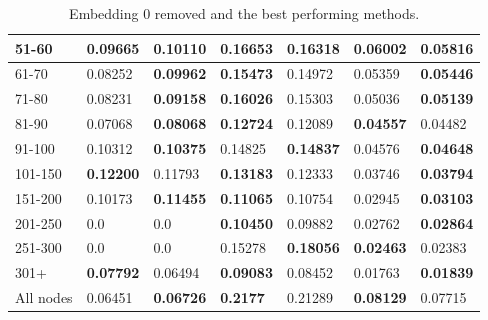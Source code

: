 \begin{table}[h!]
\begin{tabular}{|l|l|l||l|l||l|l|}
        51-60     & 0.09665                                 & \textbf{0.10110}               & \textbf{0.16653}                 & 0.16318           & 0.06002          & \textbf{0.05816}  \\ \hline
        61-70     & 0.08252                                 & \textbf{0.09962}               & \textbf{0.15473}                 & 0.14972           & 0.05359          & \textbf{0.05446}  \\ \hline
        71-80     & 0.08231                                 & \textbf{0.09158}               & \textbf{0.16026}                 & 0.15303           & 0.05036          & \textbf{0.05139}  \\ \hline
        81-90     & 0.07068                                 & \textbf{0.08068}               & \textbf{0.12724}                 & 0.12089           & \textbf{0.04557} & 0.04482           \\ \hline
        91-100    & 0.10312                                 & \textbf{0.10375}               & 0.14825                          & \textbf{0.14837}  & 0.04576          & \textbf{0.04648}  \\ \hline
        101-150   & \textbf{0.12200}                        & 0.11793                        & \textbf{0.13183}                 & 0.12333           & 0.03746          & \textbf{0.03794}  \\ \hline
        151-200   & 0.10173                                 & \textbf{0.11455}               & \textbf{0.11065}                 & 0.10754           & 0.02945          & \textbf{0.03103}  \\ \hline
        201-250   & 0.0                                     & 0.0                            & \textbf{0.10450}                 & 0.09882           & 0.02762          & \textbf{0.02864}  \\ \hline
        251-300   & 0.0                                     & 0.0                            & 0.15278                          & \textbf{0.18056}  & \textbf{0.02463} & 0.02383           \\ \hline
        301+      & \textbf{0.07792}                        & 0.06494                        & \textbf{0.09083}                 & 0.08452           & 0.01763          & \textbf{0.01839}  \\ \hline
        All nodes & 0.06451                                 & \textbf{0.06726}               & \textbf{0.2177 }                 & 0.21289           & \textbf{0.08129} & 0.07715           \\ \hline
    \end{tabular}
    \caption{Embedding 0 removed and the best performing methods.}
    \label{tab:recall-adjusted-layer-remove-0-embedding}
\end{table}
